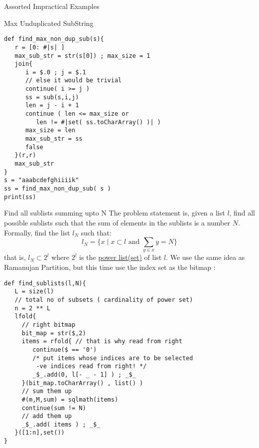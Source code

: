 \begin{section}{Assorted Impractical Examples}
\begin{subsection}{Max Unduplicated SubString}
\begin{center}\begin{minipage}{\linewidth}
\begin{lstlisting}[style=JexlStyle]
def find_max_non_dup_sub(s){
   r = [0: #|s| ] 
   max_sub_str = str(s[0]) ; max_size = 1  
   join{
      i = $.0 ; j = $.1 
      // else it would be trivial 
      continue( i >= j )
      ss = sub(s,i,j)
      len = j - i + 1
      continue ( len <= max_size or 
         len != #|set( ss.toCharArray() )| )
      max_size = len  
      max_sub_str = ss 
      false 
   }(r,r)
   max_sub_str 
}
s = "aaabcdefghiiiik"
ss = find_max_non_dup_sub( s )
print(ss)
\end{lstlisting}  
\end{minipage}\end{center} 

\end{subsection}

\begin{subsection}{Find all sublists summing upto N}
The problem statement is, given a list $l$, find all possible sublists such that
the sum of elements in the sublists is a number $N$.
Formally, find the list $l_N$ such that:
$$
l_N = \{ x \; | \; x \subset l \text{ and } \sum_{y \in x } y = N \}
$$
that is, $l_N \subset 2^l$ where $2^l$ is the \href{https://en.wikipedia.org/wiki/Power\_set}{power list(set)} of list $l$.
We use the same idea as Ramanujan Partition, but this time use the index set as the bitmap :

\begin{center}\begin{minipage}{\linewidth}
\begin{lstlisting}[style=JexlStyle]
def find_sublists(l,N){
   L = size(l) 
   // total no of subsets ( cardinality of power set)
   n = 2 ** L
   lfold{
     // right bitmap 
     bit_map = str($,2)
     items = rfold{ // that is why read from right
        continue($ == '0')  
        /* put items whose indices are to be selected 
         -ve indices read from right! */
        _$_.add(0, l[- _ - 1] ) ; _$_  
     }(bit_map.toCharArray() , list() )
     // sum them up 
     #(m,M,sum) = sqlmath(items)
     continue(sum != N)
     // add them up 
     _$_.add( items ) ; _$_   
   }([1:n],set())   
}
\end{lstlisting}  
\end{minipage}\end{center} 
\end{subsection}



\end{section}




